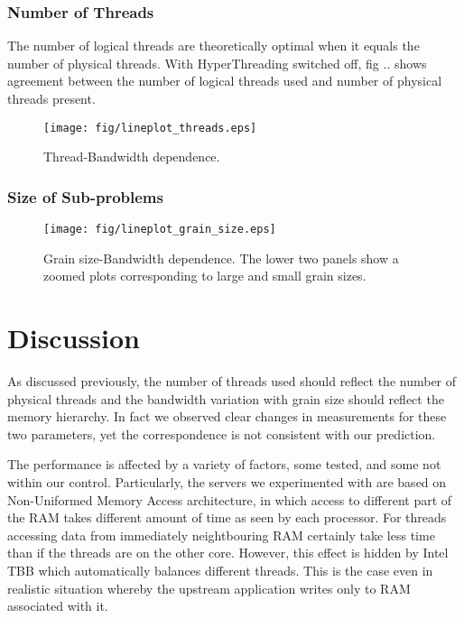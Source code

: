 \documentclass[journal]{IEEEtran}
\begin{document}
\subsubsection{Number of Threads}
The number of logical threads are theoretically optimal when it equals the number of physical threads. With HyperThreading switched off, fig .. shows agreement between the number of logical threads used and number of physical threads present. 

\begin{figure}[h]
\centering
\texttt{[image: fig/lineplot\_threads.eps]}
\caption{Thread-Bandwidth dependence. }\label{thread}

\end{figure}


\subsubsection{Size of Sub-problems}
\begin{figure}[h]
\centering
\texttt{[image: fig/lineplot\_grain\_size.eps]}
\caption{Grain size-Bandwidth dependence. The lower two panels show a zoomed plots corresponding to large and small grain sizes.}\label{grain_size}

\end{figure}




\section{Discussion}
As discussed previously, the number of threads used should reflect the number of physical threads and the bandwidth variation with grain size should reflect the memory hierarchy. In fact we observed clear changes in measurements for these two parameters, yet the correspondence is not consistent with our prediction.

The performance is affected by a variety of factors, some tested, and some not within our control. Particularly, the servers we experimented with are based on Non-Uniformed Memory Access architecture, in which access to different part of the RAM takes different amount of time as seen by each processor. For threads accessing data from immediately neightbouring RAM certainly take less time than if the threads are on the other core. However, this effect is hidden by Intel TBB which automatically balances different threads. This is the case even in realistic situation whereby the upstream application writes only to RAM associated with it. \\
\end{document}
